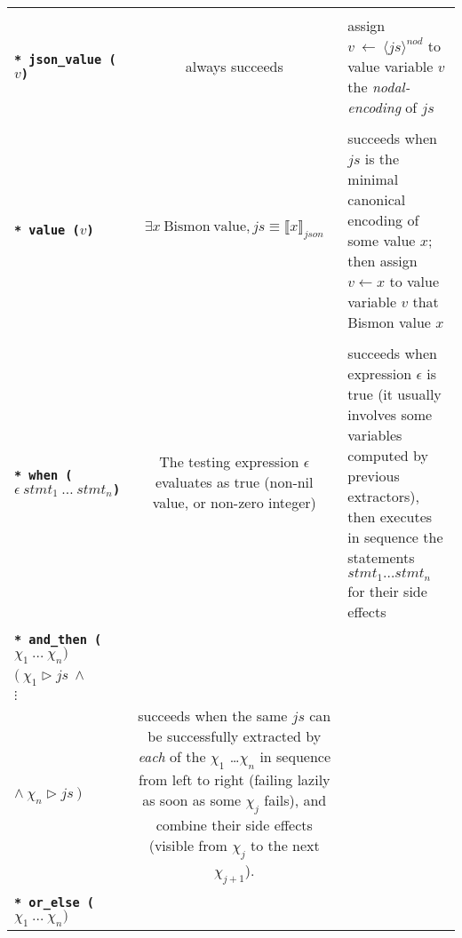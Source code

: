 \begin{table}
\begin{relsize}{-1.2}
\begin{center}
\begin{tabular}{lcp{5.7cm}}
      \rule{0pt}{1ex} \\ 
      \texttt{\textbf{* json\_value ($v$)}} &
      always succeeds &
      assign  $v ~ \leftarrow ~ \langle \mathit{js} \rangle^{nod}$ to value variable $v$ the \emph{nodal-encoding} of $js$ \\
      \rule{0pt}{1ex} \\    
      \texttt{\textbf{* value ($v$)}} &
      $\exists x ~ \mathrm{Bismon ~ value}, js \equiv  \llbracket x \rrbracket_{json}$  &
      succeeds when $js$ is the minimal canonical encoding of some value $x$;
      then assign $v \leftarrow x$ to value variable $v$ that Bismon value $x$ \\
      \rule{0pt}{1ex} \\      
      \texttt{\textbf{* when ($\epsilon ~ \mathit{stmt}_1 ~ \ldots ~ \mathit{stmt}_n$)}} &
      \begin{minipage}[t]{4.5cm}
      The testing expression $\epsilon$
      evaluates as true (non-nil value, or non-zero integer)
      \end{minipage} &
      succeeds when expression $\epsilon$ is true (it usually involves
      some variables computed by previous extractors), then executes
      in sequence the statements $\mathit{stmt}_1 \ldots
      \mathit{stmt}_n$ for their side effects
      \\
      \rule{0pt}{1ex} \\     
      \texttt{\textbf{* and\_then ($\chi_1 ~ \ldots ~ \chi_n)$}} &
      \begin{minipage}[t]{4.5cm} sequentially and lazily \\
        $ ( ~ \chi_1 \triangleright \mathit{js} ~ \wedge $ \\
        \hspace*{2em} $ \vdots$ \\
        \hspace*{1em} $ \wedge ~ \chi_n \triangleright \mathit{js} ~ ) $
      \end{minipage} &      
      succeeds when the same $\mathit{js}$ can be successfully
      extracted by \emph{each} of the $\chi_1$ \ldots $\chi_n$ in sequence from left to right
      (failing lazily as soon as some $\chi_j$ fails), and combine
      their side effects (visible from $\chi_j$ to the next
      $\chi_{j+1}$).  \\
      \rule{0pt}{1ex} \\
      \texttt{\textbf{* or\_else ($\chi_1 ~ \ldots ~ \chi_n)$}} &

\end{tabular}
\end{center}
\end{relsize}
\end{table}
